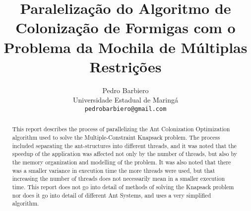 \documentclass[12pt,a4paper]{article}
\begin{document}
\title{Paralelização do Algoritmo de Colonização de Formigas com o Problema da Mochila de Múltiplas Restrições}

\author{Pedro Barbiero\\
	Universidade Estadual de Maringá\\
	{\tt pedrobarbiero@gmail.com}
}

\maketitle

\begin{abstract}
	This report describes the process of parallelizing the Ant Colonization Optimization algorithm used to solve the Multiple-Constraint Knapsack problem. The process included separating the ant-structures into different threads, and it was noted that the speedup of the application was affected not only by the number of threads, but also by the memory organization and modelling of the problem. 
	It was also noted that there was a smaller variance in execution time the more threads were used, but that increasing the number of threads does not necessarily mean in a smaller execution time. This report does not go into detail of methods of solving the Knapsack problem nor does it go into detail of different Ant Systems, and uses a very simplified algorithm.
	
\end{abstract}
















\end{document}
